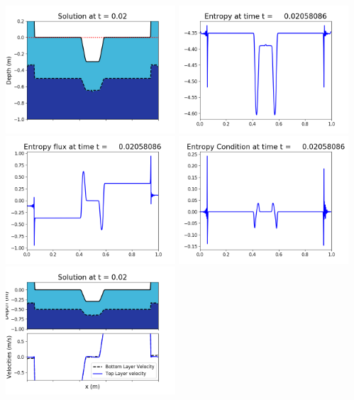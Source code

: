 \documentclass[11pt]{article}
\begin{document}
\includegraphics[width=0.475\textwidth]{frame0048fig1006.png}
\vskip 10pt 
\includegraphics[width=0.475\textwidth]{frame0048fig1007.png}
\includegraphics[width=0.475\textwidth]{frame0048fig1008.png}
\vskip 10pt 
\includegraphics[width=0.475\textwidth]{frame0048fig1009.png}
\vskip 10pt 
\includegraphics[width=0.475\textwidth]{frame0049fig1001.png}
\end{document}
